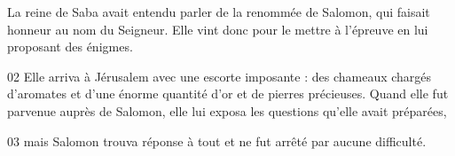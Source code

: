 La reine de Saba avait entendu parler de la renommée de Salomon, qui faisait honneur au nom du Seigneur. Elle vint donc pour le mettre à l’épreuve en lui proposant des énigmes.

02 Elle arriva à Jérusalem avec une escorte imposante : des chameaux chargés d’aromates et d’une énorme quantité d’or et de pierres précieuses. Quand elle fut parvenue auprès de Salomon, elle lui exposa les questions qu’elle avait préparées,

03 mais Salomon trouva réponse à tout et ne fut arrêté par aucune difficulté.
